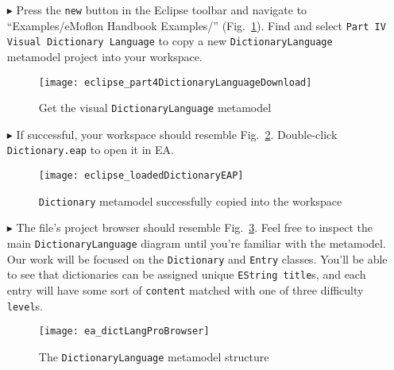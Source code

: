 \begin{itemize}

\item[$\blacktriangleright$] Press the \texttt{new} button in the Eclipse toolbar and navigate to ``Examples/eMoflon Handbook Examples/''
(Fig.~\ref{eclipse:dictionaryDownloadWizard}). Find and select \texttt{Part IV Visual Dictionary Language} to copy a new \texttt{Dict\-ion\-ary\-Lang\-uage}
metamodel project into your workspace.

\vspace{0.5cm}

\begin{figure}[htbp]
\begin{center}
  \texttt{[image: eclipse\_part4DictionaryLanguageDownload]}
  \caption{Get the visual \texttt{DictionaryLanguage} metamodel}
  \label{eclipse:dictionaryDownloadWizard}
\end{center}
\end{figure}

\item[$\blacktriangleright$] If successful, your workspace should resemble Fig.~\ref{eclipse:loadedDictionaryEAP}. Double-click
\texttt{Dictionary.eap} to open it in EA.

\newpage

\begin{figure}[htbp]
\begin{center}
  \texttt{[image: eclipse\_loadedDictionaryEAP]}
  \caption{\texttt{Dictionary} metamodel successfully copied into the workspace}
  \label{eclipse:loadedDictionaryEAP}
\end{center}
\end{figure}

\item[$\blacktriangleright$] The file's project browser should resemble Fig.~\ref{ea:dictionaryLangStart}. Feel free to inspect the main
\texttt{DictionaryLanguage} diagram until you're familiar with the metamodel. Our work will be focused on the \texttt{Dictionary} and \texttt{Entry} classes.
You'll be able to see that dictionaries can be assigned unique \texttt{EString title}s, and each entry will have some sort of \texttt{content} matched with one
of three difficulty \texttt{level}s.

\vspace{0.5cm}

\begin{figure}[htbp]
\begin{center}
  \texttt{[image: ea\_dictLangProBrowser]}
  \caption{The \texttt{DictionaryLanguage} metamodel structure}
  \label{ea:dictionaryLangStart}
\end{center}
\end{figure}


\end{itemize}
